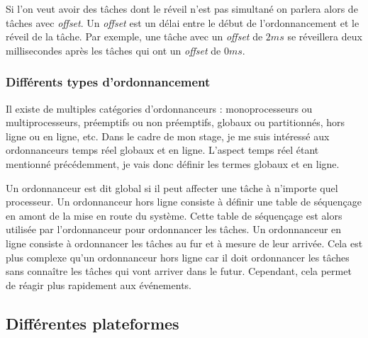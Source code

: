 Si l'on veut avoir des tâches dont le réveil n'est pas simultané on parlera alors de tâches avec \textit{offset}. Un \textit{offset} est un délai entre le début de l'ordonnancement et le réveil de la tâche. Par exemple, une tâche avec un \textit{offset} de $2 ms$ se réveillera deux millisecondes après les tâches qui ont un \textit{offset} de $0 ms$.



\subsubsection{Différents types d'ordonnancement}

Il existe de multiples catégories d'ordonnanceurs : monoprocesseurs ou multiprocesseurs, préemptifs ou non préemptifs, globaux ou partitionnés, hors ligne ou en ligne, etc. Dans le cadre de mon stage, je me suis intéressé aux ordonnanceurs temps réel globaux et en ligne. L'aspect temps réel étant mentionné précédemment, je vais donc définir les termes globaux et en ligne. 

Un ordonnanceur est dit global si il peut affecter une tâche à n'importe quel processeur. Un ordonnanceur hors ligne consiste à définir une table de séquençage en amont de la mise en route du système. Cette table de séquençage est alors utilisée par l'ordonnanceur pour ordonnancer les tâches. Un ordonnanceur en ligne consiste à ordonnancer les tâches au fur et à mesure de leur arrivée. Cela est plus complexe qu'un ordonnanceur hors ligne car il doit ordonnancer les tâches sans connaître les tâches qui vont arriver dans le futur. Cependant, cela permet de réagir plus rapidement aux événements.


\subsection{Différentes plateformes}

